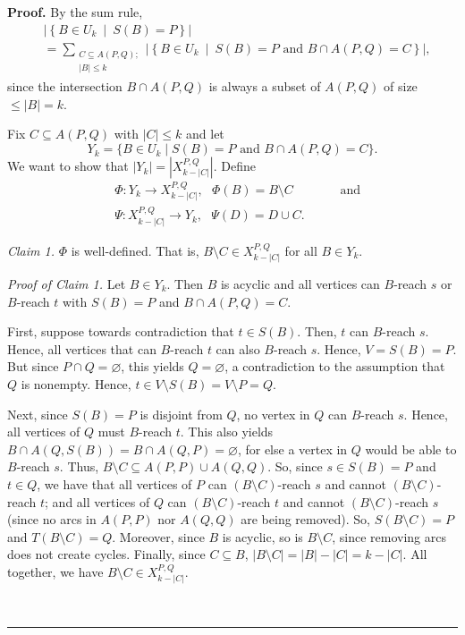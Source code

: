\documentclass[numbers=enddot,12pt,final,onecolumn,notitlepage]{scrartcl}%
\theoremstyle{definition}
\newenvironment{proof}[1][Proof]{\noindent\textbf{#1.} }{\ \rule{0.5em}{0.5em}}
\let\sumnonlimits\sum
\renewcommand{\sum}{\sumnonlimits\limits}
\theoremstyle{plainsl}
\begin{document}
\begin{proof}
    By the sum rule,
	\begin{align*}
&  \left\vert \left\{  B\in U_{k}\ \mid\ S\left(  B\right)  =P\right\}
\right\vert \\
&  =\sum_{\substack{C\subseteq A\left(  P,Q\right); \\ \left|B\right| \leq k}  }\left\vert \left\{  B\in
U_{k}\ \mid\ S\left(  B\right)  =P\text{ and }B\cap A\left(  P,Q\right)
=C\right\}  \right\vert ,
\end{align*}
since the intersection $B\cap A\left(  P,Q\right)  $ is always a subset of
$A\left(  P,Q\right)  $ of size $\leq \left|B\right| = k$.

Fix $C \subseteq A(P,Q)$ with $|C| \leq k$ and let \begin{equation*}
    Y_k = \{B \in U_{k} \mid  S(B) = P \text{ and } B \cap A(P,Q) = C\}.
\end{equation*} We want to show that $|Y_k| = |X_{k-|C|}^{P,Q}|$. Define \begin{align*}
    &\Phi : Y_k \to X_{k-|C|}^{P,Q}, \ \ \ \Phi(B) = B \setminus C \ \ \ \ \ \ \ \ \ \ \ \ \ \ \ \ \ \text{and} \\
    &\Psi : X_{k-|C|}^{P,Q} \to Y_{k}, \ \ \ \Psi(D) = D \cup C.
\end{align*}

\textit{Claim 1.} $\Phi$ is well-defined. That is, $B \setminus C \in X_{k-|C|}^{P,Q}$ for all $B \in Y_{k}$.

\smallskip
\textit{Proof of Claim 1.} Let $B \in Y_{k}$. Then $B$ is acyclic and all vertices can $B$-reach $s$ or $B$-reach $t$ with $S(B) = P$ and $B \cap A(P,Q) = C$.

First, suppose towards contradiction that $t \in S(B)$. Then, $t$ can $B$-reach $s$. Hence, all vertices that can $B$-reach $t$ can also $B$-reach $s$. Hence, $V = S(B) = P$. But since $P \cap Q = \varnothing$, this yields $Q = \varnothing$, a contradiction to the assumption that $Q$ is nonempty. Hence, $t \in V \setminus S(B) = V \setminus P = Q$. 

Next, since $S(B) = P$ is disjoint from $Q$, no vertex in $Q$ can $B$-reach $s$. Hence, all vertices of $Q$ must $B$-reach $t$. This also yields $B \cap A(Q,S(B)) = B \cap A(Q,P) = \varnothing$, for else a vertex in $Q$ would be able to $B$-reach $s$. Thus, $B \setminus C \subseteq A(P,P) \cup A(Q,Q)$. So, since $s \in S(B) = P$ and $t \in Q$, we have that all vertices of $P$ can $(B \setminus C)$-reach $s$ and cannot $(B \setminus C)$-reach $t$; and all vertices of $Q$ can $(B \setminus C)$-reach $t$ and cannot $(B \setminus C)$-reach $s$ (since no arcs in $A(P,P)$ nor $A(Q,Q)$ are being removed). So, $S(B \setminus C) = P$ and $T(B \setminus C) = Q$. Moreover, since $B$ is acyclic, so is $B \setminus C$, since removing arcs does not create cycles. Finally, since $C \subseteq B$, $|B \setminus C| = |B|-|C| = k-|C|$. All together, we have $B \setminus C \in X_{k-|C|}^{P,Q}$.


\end{proof}
\end{document}

